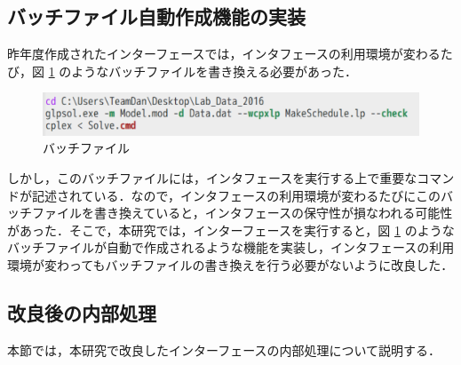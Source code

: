 \documentclass[a4paper,12pt,fleqn]{jarticle}
\begin{document}
\subsection{バッチファイル自動作成機能の実装}
昨年度作成されたインターフェースでは，インタフェースの利用環境が変わるたび，図 \ref{fig:bat} のようなバッチファイルを書き換える必要があった．
\begin{figure}[H]
  \begin{center}
    \includegraphics[scale=0.7]{bat.png}
    \caption{バッチファイル}
    \label{fig:bat}
  \end{center}
\end{figure}
しかし，このバッチファイルには，インタフェースを実行する上で重要なコマンドが記述されている．なので，インタフェースの利用環境が変わるたびにこのバッチファイルを書き換えていると，インタフェースの保守性が損なわれる可能性があった．そこで，本研究では，インターフェースを実行すると，図 \ref{fig:bat} のようなバッチファイルが自動で作成されるような機能を実装し，インタフェースの利用環境が変わってもバッチファイルの書き換えを行う必要がないように改良した．

\subsection{改良後の内部処理} \label{sec:InternalProcessing}
本節では，本研究で改良したインターフェースの内部処理について説明する．
\end{document}
